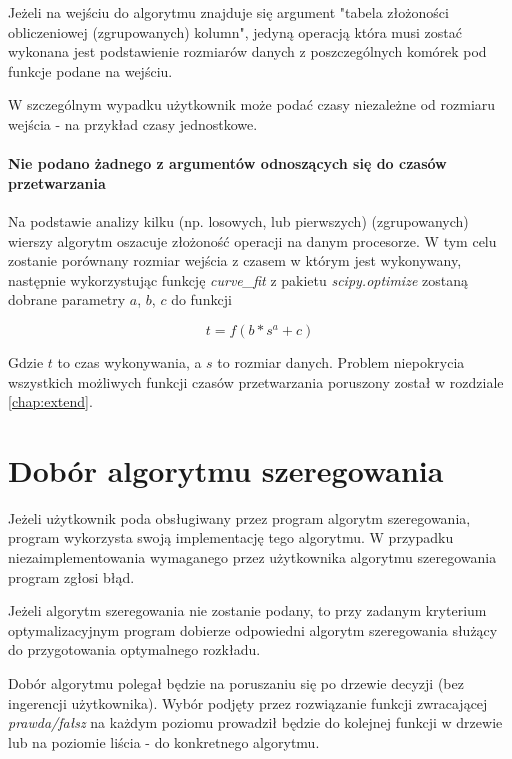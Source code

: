 \documentclass[brudnopis]{xmgr}
\begin{document}
Jeżeli na wejściu do algorytmu znajduje się argument "tabela złożoności obliczeniowej (zgrupowanych) kolumn", jedyną operacją która musi zostać wykonana jest podstawienie rozmiarów danych z poszczególnych komórek pod funkcje podane na wejściu.

W szczególnym wypadku użytkownik może podać czasy niezależne od rozmiaru wejścia - na przykład czasy jednostkowe.

\paragraph{Nie podano żadnego z argumentów odnoszących się do czasów przetwarzania}

Na podstawie analizy kilku (np. losowych, lub pierwszych) (zgrupowanych) wierszy algorytm oszacuje złożoność operacji na danym procesorze.
W tym celu zostanie porównany rozmiar wejścia z czasem w którym jest wykonywany, następnie wykorzystując funkcję \emph{curve\_fit} z pakietu \emph{scipy.optimize} zostaną dobrane parametry $a$, $b$, $c$ do funkcji

$$t = f(b * s^a + c)$$

Gdzie $t$ to czas wykonywania, a $s$ to rozmiar danych.
Problem niepokrycia wszystkich możliwych funkcji czasów przetwarzania poruszony został w rozdziale \ref{chap:extend}.


\section{Dobór algorytmu szeregowania}


Jeżeli użytkownik poda obsługiwany przez program algorytm szeregowania, program wykorzysta swoją implementację tego algorytmu.
W przypadku niezaimplementowania wymaganego przez użytkownika algorytmu szeregowania program zgłosi błąd.

Jeżeli algorytm szeregowania nie zostanie podany, to przy zadanym kryterium optymalizacyjnym program dobierze odpowiedni algorytm szeregowania służący do przygotowania optymalnego rozkładu.

Dobór algorytmu polegał będzie na poruszaniu się po drzewie decyzji (bez ingerencji użytkownika).
Wybór podjęty przez rozwiązanie funkcji zwracającej \emph{prawda/fałsz} na każdym poziomu prowadził będzie do kolejnej funkcji w drzewie lub na poziomie liścia - do konkretnego algorytmu.
\end{document}
